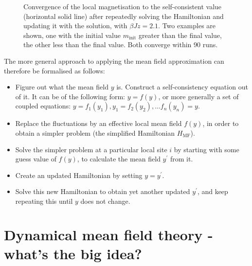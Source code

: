 \documentclass[12pt,onecolumn]{revtex4-2}
\begin{document}
\begin{figure}[htpb]
	\centering
	\caption{Convergence of the local magnetisation to the self-consistent value (horizontal solid line) after repeatedly solving the Hamiltonian and updating it with the solution, with \(\beta J z = 2.1\). Two examples are shown, one with the initial value \(m_\text{init}\) greater than the final value, the other less than the final value. Both converge within 90 runs.}
	\label{ising-selfconsistency}
\end{figure}

The more general approach to applying the mean field approximation can therefore be formalised as follows:
\begin{itemize}
	\item Figure out what the mean field \(y\) is. Construct a self-consistency equation out of it. It can be of the following form: $y = f(y)$, or more generally a set of coupled equations: \(y = f_1(y_1), y_1 = f_2(y_2),\ldots f_n(y_n)=y\).
	\item Replace the fluctuations by an effective local mean field \(f(y)\), in order to obtain a simpler problem (the simplified Hamiltonian \(H_\text{MF}\)).
	\item Solve the simpler problem at a particular local site \(i\) by starting with some guess value of \(f(y)\), to calculate the mean field \(y^\prime\) from it.
	\item Create an updated Hamiltonian by setting \(y=y^\prime\).
	\item Solve this new Hamiltonian to obtain yet another updated \(y^\prime\), and keep repeating this until \(y\) does not change.
\end{itemize}

\section{Dynamical mean field theory - what's the big idea?}
\end{document}
